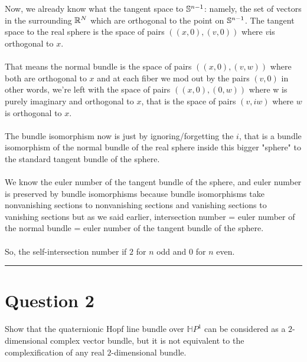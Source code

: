 \documentclass[11pt]{article}
\begin{document}
\\
\\
Now, we already know what the tangent space to $\mathbb{S}^{n-1}$: namely, the set of vectors in the surrounding $\mathbb{R}^N$ which are orthogonal to the point on $\mathbb{S}^{n-1}$. The tangent space to the real sphere is the space of pairs $((x, 0), (v, 0))$ where $v $is orthogonal to $x$.
\\
\\
That means the normal bundle is the space of pairs $((x, 0), (v, w))$ where both are orthogonal to $x$ and at each fiber we mod out by the pairs $(v, 0)$ in other words, we're left with the space of pairs $((x, 0), (0, w))$ where w is purely imaginary and orthogonal to $x$, that is the space of pairs $(v, iw)$ where $w$ is orthogonal to $x$. 
\\
\\
The bundle isomorphism now is just by ignoring/forgetting the $i$, that is a bundle isomorphism of the normal bundle of the real sphere inside this bigger "sphere" to the standard tangent bundle of the sphere.
\\
\\
We know the euler number of the tangent bundle of the sphere, and euler number is preserved by bundle isomorphisms because bundle isomorphisms take nonvanishing sections to nonvanishing sections and vanishing sections to vanishing sections but as we said earlier, intersection number = euler number of the normal bundle = euler number of the tangent bundle of the sphere.
\\
\\
So, the self-intersection number if $2$ for $n$ odd and $0$ for $n$ even. 

\vskip 0.5cm
\hrule
\pagebreak

\section{Question 2}
\begin{bluebox}
  Show that the quaternionic Hopf line bundle over $\mathbb{H}P^1$ can be considered as a $2$-dimensional complex vector bundle, but it is not equivalent to the complexification of any real $2$-dimensional bundle.
\end{bluebox}
\end{document}
